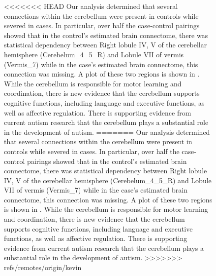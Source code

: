 \documentclass{nature}
\begin{document}
{\begin{figure}[tb]
<<<<<<< HEAD
Our analysis determined that several connections within the cerebellum were present
in controls while severed in cases. In particular, over half the case-control
pairings showed that in the control's estimated brain connectome, 
there was statistical dependency between Right lobule IV, V of the cerebellar
hemisphere (Cerebelum\_4\_5\_R) and Lobule VII of vermis (Vermis\_7) while in the
case's estimated brain connectome, this connection was missing. A plot
of these two regions is shown in . While the cerebellum
is responsible for motor learning and coordination, there is new evidence that
the cerebellum supports cognitive functions, including language and executive functions,
as well as affective regulation\cite{goines2011autoantibodies,braunschweig2012maternal}.
There is supporting evidence from current autism research that the cerebellum plays
a substantial role in the development of autism\cite{d2015cerebellar,becker2013autism,wang2014cerebellum}.
=======
Our analysis determined that several connections within the cerebellum were
present
in controls while severed in cases. In particular, over half the case-control
pairings showed that in the control's estimated brain connectome, 
there was statistical dependency between Right lobule IV, V of the cerebellar
hemisphere (Cerebelum\_4\_5\_R) and Lobule VII of vermis (Vermis\_7) while in
the
case's estimated brain connectome, this connection was missing. A plot
of these two regions is shown in . While the cerebellum
is responsible for motor learning and coordination, there is new evidence that
the cerebellum supports cognitive functions, including language and executive
functions,
as well as affective
regulation\cite{goines2011autoantibodies,braunschweig2012maternal}.
There is supporting evidence from current autism research that the cerebellum
plays
a substantial role in the development of
autism\cite{d2015cerebellar,becker2013autism,wang2014cerebellum}.
>>>>>>> refs/remotes/origin/kevin


\end{figure}}
\end{document}
